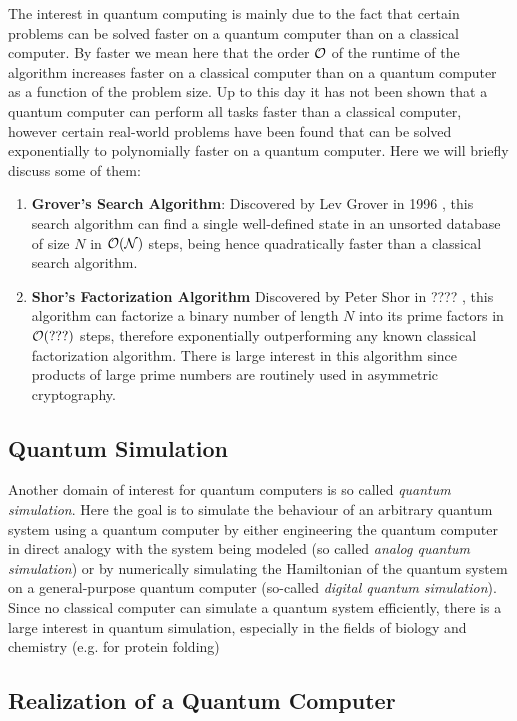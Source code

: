 The interest in quantum computing is mainly due to the fact that certain problems can be solved faster on a quantum computer than on a classical computer. By faster we mean here that the order $\cal{O}$ of the runtime of the algorithm increases faster on a classical computer than on a quantum computer as a function of the problem size. Up to this day it has not been shown that a quantum computer can perform all tasks faster than a classical computer, however certain real-world problems have been found that can be solved exponentially to polynomially faster on a quantum computer. Here we will briefly discuss some of them:

\begin{enumerate}
\item \textbf{Grover's Search Algorithm}: Discovered by Lev Grover in 1996 \citep{grover_fast_1996}, this search algorithm can find a single well-defined state in an unsorted database of size $N$ in $\cal{O}(N)$ steps, being hence quadratically faster than a classical search algorithm.
\item \textbf{Shor's Factorization Algorithm} Discovered by Peter Shor in ???? \citep{}, this algorithm can factorize a binary number of length $N$ into its prime factors in $\cal{O}(???)$ steps, therefore exponentially outperforming any known classical factorization algorithm. There is large interest in this algorithm since products of large prime numbers are routinely used in asymmetric cryptography.
\end{enumerate}

\subsection{Quantum Simulation}

Another domain of interest for quantum computers is so called {\it quantum simulation}. Here the goal is to simulate the behaviour of an arbitrary quantum system using a quantum computer by either engineering the quantum computer in direct analogy with the system being modeled (so called {\it analog quantum simulation}) or by numerically simulating the Hamiltonian of the quantum system on a general-purpose quantum computer (so-called {\it digital quantum simulation}). Since no classical computer can simulate a quantum system efficiently, there is a large interest in quantum simulation, especially in the fields of biology and chemistry (e.g. for protein folding\cite{})

\subsection{Realization of a Quantum Computer}


